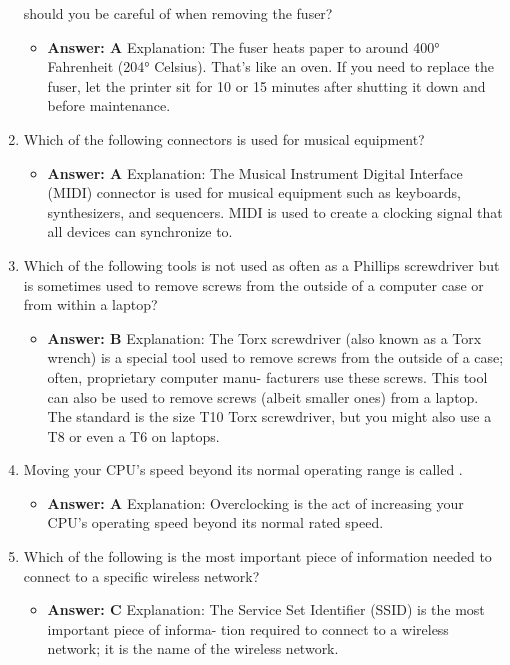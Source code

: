 \documentclass{article}
\begin{document}
\begin{enumerate}
should you be careful of when removing the fuser?
    \begin{itemize}
        \item \textbf{Answer: A}
Explanation: The fuser heats paper to around 400° Fahrenheit (204° Celsius). That’s
like an oven. If you need to replace the fuser, let the printer sit for 10 or 15 minutes
after shutting it down and before maintenance.
    \end{itemize}
    \item Which of the following connectors is used for musical equipment?
    \begin{itemize}
        \item \textbf{Answer: A}
Explanation: The Musical Instrument Digital Interface (MIDI) connector is used for
musical equipment such as keyboards, synthesizers, and sequencers. MIDI is used to
create a clocking signal that all devices can synchronize to.
    \end{itemize}
    \item Which of the following tools is not used as often as a Phillips
screwdriver but is sometimes used to remove screws from the
outside of a computer case or from within a laptop?
    \begin{itemize}
        \item \textbf{Answer: B}
Explanation: The Torx screwdriver (also known as a Torx wrench) is a special tool
used to remove screws from the outside of a case; often, proprietary computer manu-
facturers use these screws. This tool can also be used to remove screws (albeit smaller
ones) from a laptop. The standard is the size T10 Torx screwdriver, but you might also
use a T8 or even a T6 on laptops.
    \end{itemize}
    \item Moving your CPU’s speed beyond its normal operating range is
called .
    \begin{itemize}
        \item \textbf{Answer: A}
Explanation: Overclocking is the act of increasing your CPU’s operating speed beyond
its normal rated speed.
    \end{itemize}
    \item Which of the following is the most important piece of information
needed to connect to a specific wireless network?
    \begin{itemize}
        \item \textbf{Answer: C}
Explanation: The Service Set Identifier (SSID) is the most important piece of informa-
tion required to connect to a wireless network; it is the name of the wireless network.

\end{itemize}
\end{enumerate}
\end{document}
